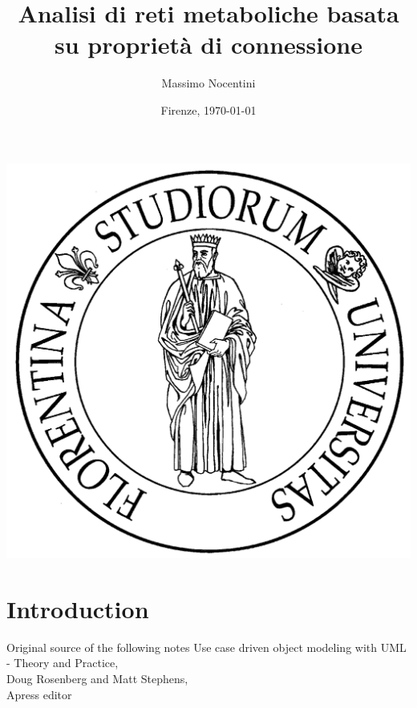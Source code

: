 \documentclass{beamer}
\title{Analisi di reti metaboliche basata su propriet\`a di
  connessione}
\author{Massimo Nocentini}
\date{Firenze, \today}
\begin{document}
\begin{frame}[plain]
  \titlepage
  \begin{center}
    \includegraphics[scale=.065]{logo/unifi}
  \end{center}
\end{frame}

\frame{\tableofcontents}

 
\section*{Introduction}  
\begin{frame}
	\begin{block}{Original source of the following notes}
    Use case driven object modeling with UML - Theory and Practice,\\
    Doug Rosenberg and Matt Stephens,\\
    Apress editor
    \end{block}
\end{frame}
 
\end{document}
